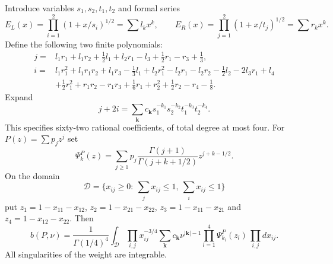 Introduce variables $s_1,s_2,t_1,t_2$ and formal series
\[
 E_L(x)=\prod_{i=1}^2(1+x/s_i)^{1/2}=\sum l_kx^k,
 \qquad E_R(x)=\prod_{j=1}^2(1+x/t_j)^{1/2}=\sum r_kx^k.
\]
Define the following two finite polynomials:
\begin{align*}
 j={}&l_1r_1+l_1r_2+\tfrac12l_1+l_2r_1-l_3
                       +\tfrac12r_1-r_3+\tfrac13,\\
 i={}&l_1r_1^2+l_1r_1r_2+l_1r_3-\tfrac13l_1
       +l_2r_1^2-l_2r_1-l_2r_2-\tfrac12l_2-2l_3r_1+l_4\\
    &+\tfrac12r_1^2+r_1r_2-r_1r_3+\tfrac16r_1+r_2^2
                  +\tfrac12r_2-r_4-\tfrac18.
\end{align*}
Expand
\[
 j+2i=\sum_{\mathbf k}c_{\mathbf k}s_1^{-k_1}s_2^{-k_2}
                                      t_1^{-k_3}t_2^{-k_4}.
\]
This specifies sixty-two rational coefficients, of total degree at most
four. For $P(z)=\sum p_jz^j$ set
\[
 \Psi_k^P(z)=\sum_{j\ge1}p_j
        \frac{\Gamma(j+1)}{\Gamma(j+k+1/2)}z^{j+k-1/2}.
\]
On the domain
\[
 \mathcal D=\{x_{ij}\ge0:\ \sum_jx_{ij}\le1,\ \sum_ix_{ij}\le1\}
\]
put $z_1=1-x_{11}-x_{12}$, $z_2=1-x_{21}-x_{22}$,
$z_3=1-x_{11}-x_{21}$ and $z_4=1-x_{12}-x_{22}$. Then
\begin{equation}\label{eq:square-b}
 b(P,\nu)=\frac1{\Gamma(1/4)^4}
 \int_{\mathcal D}\prod_{i,j}x_{ij}^{-3/4}
   \sum_{\mathbf k}c_{\mathbf k}\nu^{|\mathbf k|-1}
            \prod_{l=1}^4\Psi_{k_l}^P(z_l)\,\prod_{i,j}dx_{ij}.
\end{equation}
All singularities of the weight are integrable.

